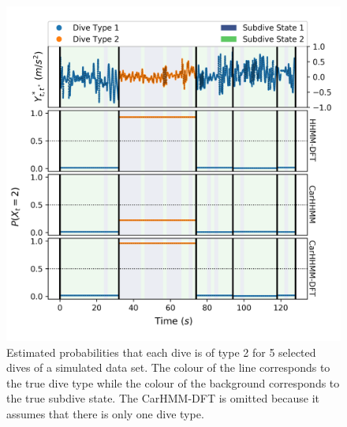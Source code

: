 \begin{figure}[ht]
    \centering
    \includegraphics[width=4.5in]{../Plots/Posterior_Coarse_States.png}
    \caption{Estimated probabilities that each dive is of type 2 for 5 selected dives of a simulated data set. The colour of the line corresponds to the true dive type while the colour of the background corresponds to the true subdive state. The CarHMM-DFT is omitted because it assumes that there is only one dive type.}
    \label{fig:acc_coarse}
\end{figure}


